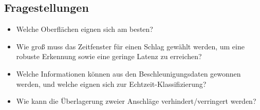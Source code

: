 \subsection*{Fragestellungen}
\begin{itemize}
	\item Welche Oberflächen eignen sich am besten?
	\item Wie groß muss das Zeitfenster für einen Schlag gewählt werden, um eine robuste Erkennung sowie eine geringe Latenz zu erreichen?
	\item Welche Informationen können aus den Beschleunigungsdaten gewonnen werden, und welche eignen sich zur Echtzeit-Klassifizierung?
	\item Wie kann die Überlagerung zweier Anschläge verhindert/verringert werden?
\end{itemize}
